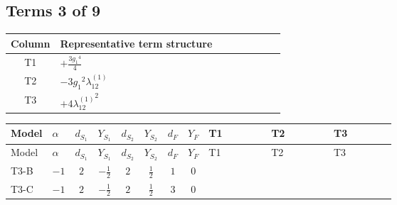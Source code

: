 \documentclass[8pt]{article}
\begin{document}
\begin{landscape}
\subsection*{Terms 3 of 9}
\begin{center}
\begin{tabular}{@{}c >{\raggedright\arraybackslash}p{0.82\linewidth}@{}}
\toprule
Column & Representative term structure \\
\midrule
T1 & \(\displaystyle +\frac{3 {g_1}^4}{4}\) \\
\midrule
T2 & \(\displaystyle -3 {g_1}^2 {\lambda_{12}^{(1)}}\) \\
\midrule
T3 & \(\displaystyle +4 {\lambda_{12}^{(1)}}^2\) \\
\midrule
\bottomrule
\end{tabular}
\end{center}
\smallskip
\tiny
\begin{longtable}{@{}llcccccc >{\raggedright\arraybackslash}p{0.21\linewidth} >{\raggedright\arraybackslash}p{0.21\linewidth} >{\raggedright\arraybackslash}p{0.21\linewidth}@{}}
\toprule
Model & $\alpha$ & $d_{S_1}$ & $Y_{S_1}$ & $d_{S_2}$ & $Y_{S_2}$ & $d_F$ & $Y_F$ & T1 & T2 & T3 \\
\midrule
\endfirsthead
\toprule
Model & $\alpha$ & $d_{S_1}$ & $Y_{S_1}$ & $d_{S_2}$ & $Y_{S_2}$ & $d_F$ & $Y_F$ & T1 & T2 & T3 \\
\midrule
\endhead
T3-B & $-1$ & $2$ & $-\frac{1}{2}$ & $2$ & $\frac{1}{2}$ & $1$ & $0$ & \scriptsize\adjustbox{max width=\linewidth}{$\begin{gathered} +\frac{3 {g_1}^4}{4}\end{gathered}$} & \scriptsize\adjustbox{max width=\linewidth}{$\begin{gathered} -3 {g_1}^2 {\lambda_{12}^{(1)}}\end{gathered}$} & \scriptsize\adjustbox{max width=\linewidth}{$\begin{gathered} +4 {\lambda_{12}^{(1)}}^2\end{gathered}$} \\
\midrule
T3-C & $-1$ & $2$ & $-\frac{1}{2}$ & $2$ & $\frac{1}{2}$ & $3$ & $0$ & \scriptsize\adjustbox{max width=\linewidth}{$\begin{gathered} +\frac{3 {g_1}^4}{4}\end{gathered}$} & \scriptsize\adjustbox{max width=\linewidth}{$\begin{gathered} -3 {g_1}^2 {\lambda_{12}^{(1)}}\end{gathered}$} & \scriptsize\adjustbox{max width=\linewidth}{$\begin{gathered} +4 {\lambda_{12}^{(1)}}^2\end{gathered}$} \\

\end{longtable}
\end{landscape}
\end{document}
